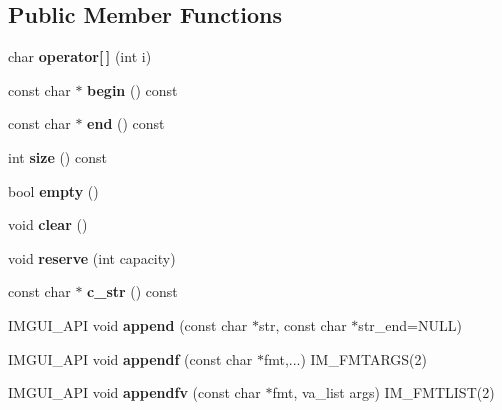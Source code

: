 \subsection*{Public Member Functions}
\begin{DoxyCompactItemize}
\item 
\mbox{\label{structImGuiTextBuffer_a8550f53463fd12711e3d08b740227bd4}} 
char {\bfseries operator\mbox{[}$\,$\mbox{]}} (int i)
\item 
\mbox{\label{structImGuiTextBuffer_aab6d83c6b9a8061287a4cb6135c1cab4}} 
const char $\ast$ {\bfseries begin} () const
\item 
\mbox{\label{structImGuiTextBuffer_a2fc30ad0d384f98dfcea722f798d91f2}} 
const char $\ast$ {\bfseries end} () const
\item 
\mbox{\label{structImGuiTextBuffer_a2811fcd43e0224eb3bd0f3464b634289}} 
int {\bfseries size} () const
\item 
\mbox{\label{structImGuiTextBuffer_afdef38ae725bb5495f0143170fa902c8}} 
bool {\bfseries empty} ()
\item 
\mbox{\label{structImGuiTextBuffer_a9e4edc9f950bc9e35d5c3b3071dbc0df}} 
void {\bfseries clear} ()
\item 
\mbox{\label{structImGuiTextBuffer_a3271f361e0f1997f4c3eb77665fdf161}} 
void {\bfseries reserve} (int capacity)
\item 
\mbox{\label{structImGuiTextBuffer_afb03439bc91723e274bfb9d247a691b9}} 
const char $\ast$ {\bfseries c\+\_\+str} () const
\item 
\mbox{\label{structImGuiTextBuffer_a9101840866a9e5408ea1e25a779a40dc}} 
I\+M\+G\+U\+I\+\_\+\+A\+PI void {\bfseries append} (const char $\ast$str, const char $\ast$str\+\_\+end=N\+U\+LL)
\item 
\mbox{\label{structImGuiTextBuffer_a1c5892db030c5364823793f472754c9e}} 
I\+M\+G\+U\+I\+\_\+\+A\+PI void {\bfseries appendf} (const char $\ast$fmt,...) I\+M\+\_\+\+F\+M\+T\+A\+R\+GS(2)
\item 
\mbox{\label{structImGuiTextBuffer_ac8a6b11834c4cee8113bf6950e66112e}} 
I\+M\+G\+U\+I\+\_\+\+A\+PI void {\bfseries appendfv} (const char $\ast$fmt, va\+\_\+list args) I\+M\+\_\+\+F\+M\+T\+L\+I\+ST(2)
\end{DoxyCompactItemize}
